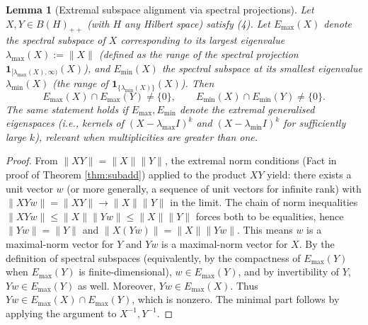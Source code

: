 \documentclass{article}
\newtheorem{lemma}[theorem]{Lemma}
\theoremstyle{remark}
\begin{document}
\begin{lemma}[Extremal subspace alignment via spectral projections]\label{lem:align}
Let $X,Y\in B(H)_{++}$ (with $H$ any Hilbert space) satisfy (4). Let $E_{\max}(X)$ denote the spectral subspace of $X$ corresponding to its largest eigenvalue $\lambda_{\max}(X):=\|X\|$ (defined as the range of the spectral projection $\mathbf{1}_{[\lambda_{\max}(X),\infty)}(X)$), and $E_{\min}(X)$ the spectral subspace at its smallest eigenvalue $\lambda_{\min}(X)$ (the range of $\mathbf{1}_{\{\lambda_{\min}(X)\}}(X)$). Then
\[
E_{\max}(X)\cap E_{\max}(Y)\neq\{0\}, \qquad E_{\min}(X)\cap E_{\min}(Y)\neq\{0\}.
\]
The same statement holds if $E_{\max}, E_{\min}$ denote the extremal generalised eigenspaces (i.e., kernels of $(X-\lambda_{\max}I)^k$ and $(X-\lambda_{\min}I)^k$ for sufficiently large $k$), relevant when multiplicities are greater than one.
\end{lemma}
\begin{proof}
From $\|XY\|=\|X\|\|Y\|$, the extremal norm conditions (Fact in proof of Theorem \ref{thm:subadd}) applied to the product $XY$ yield: there exists a unit vector $w$ (or more generally, a sequence of unit vectors for infinite rank) with $\|XYw\|=\|XY\|\to\|X\|\|Y\|$ in the limit. The chain of norm inequalities $\|XYw\|\le\|X\|\|Yw\|\le\|X\|\|Y\|$ forces both to be equalities, hence $\|Yw\|=\|Y\|$ and $\|X(Yw)\|=\|X\|\|Yw\|$. This means $w$ is a maximal-norm vector for $Y$ and $Yw$ is a maximal-norm vector for $X$. By the definition of spectral subspaces (equivalently, by the compactness of $E_{\max}(Y)$ when $E_{\max}(Y)$ is finite-dimensional), $w\in E_{\max}(Y)$, and by invertibility of $Y$, $Yw\in E_{\max}(Y)$ as well. Moreover, $Yw\in E_{\max}(X)$. Thus $Yw\in E_{\max}(X)\cap E_{\max}(Y)$, which is nonzero. The minimal part follows by applying the argument to $X^{-1},Y^{-1}$.
\end{proof}
\end{document}
